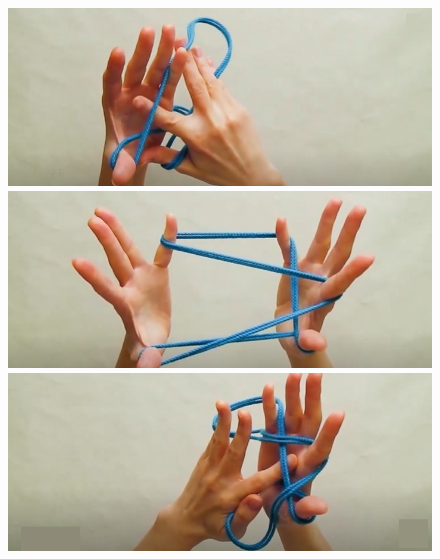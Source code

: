 \begin{multicols}{2}
	\begin{figure}[H]
		\vspace*{-5pt}
		\centering
		\captionsetup{labelformat= empty, justification=centering}
		\includegraphics[width=0.81\linewidth]{3a}
		
		\vspace*{1pt}
		\includegraphics[width=0.81\linewidth]{3b}
			
		\vspace*{1pt}
		\includegraphics[width=0.81\linewidth]{3c}
				

\end{figure}
\end{multicols}
